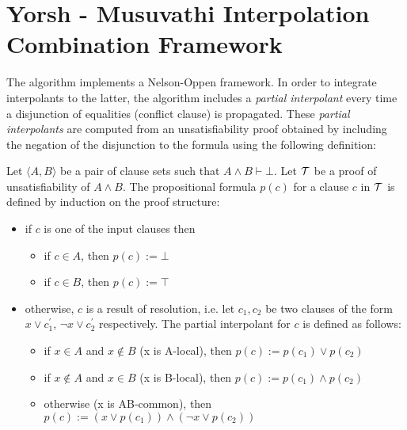\section{Yorsh - Musuvathi Interpolation Combination Framework}

The algorithm implements a Nelson-Oppen framework. In order to 
integrate interpolants to the latter, the algorithm includes a 
\emph{partial interpolant} every time a disjunction of equalities 
(conflict clause) is propagated. These \emph{partial interpolants} are 
computed from an unsatisfiability proof obtained by including the 
negation of the disjunction to the formula using the following
definition: 

\begin{definition} \cite{10.1007/11532231_26}
  Let $\langle A, B \rangle$ be a pair of clause sets such
  that $A \land B \vdash \bot$. Let $\cal{T}$ be a proof of
  unsatisfiability of $A \land B$. The propositional 
  formula $p(c)$ for a clause $c$ in $\cal{T}$ is defined
  by induction on the proof structure:
  \begin{itemize}
    \item if $c$ is one of the input clauses then
      \begin{itemize}
        \item if $c \in A$, then $p(c) := \bot$
        \item if $c \in B$, then $p(c) := \top$
      \end{itemize}
    \item otherwise, $c$ is a result of resolution, i.e. 
      let $c_1, c_2$ be two clauses of the form $x \lor c_1^{'}$,
      $\neg x \lor c_2^{'}$ respectively. The partial interpolant 
      for $c$ is defined as follows:
      \begin{itemize}
        \item if $x \in A$ and $x \not \in B$ (x is A-local), then $p(c) := p(c_1) \lor p(c_2)$
        \item if $x \not \in A$ and $x \in B$ (x is B-local), then $p(c) := p(c_1) \land p(c_2)$
        \item otherwise (x is AB-common), then $p(c) := (x \lor p(c_1)) \land (\neg x \lor p(c_2))$
      \end{itemize}
  \end{itemize}
\end{definition}

